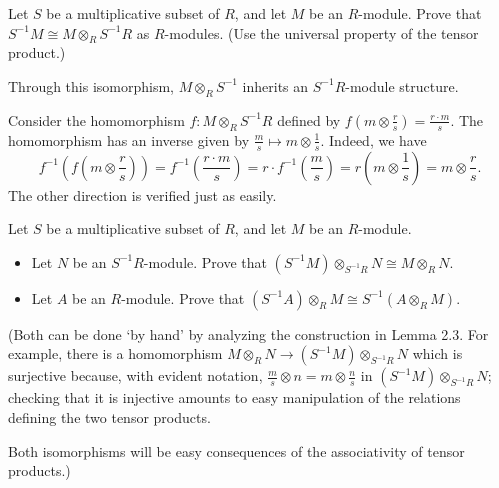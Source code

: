 \documentclass[../../master.tex]{subfiles}
\begin{document}
\begin{problem}
    Let $S$ be a multiplicative subset of $R$, and let $M$ be an $R$-module.
    Prove that $S^{-1}M \cong M \otimes_R S^{-1}R$ as $R$-modules.
    (Use the universal property of the tensor product.)

    Through this isomorphism, $M \otimes_R S^{-1}$ inherits an $S^{-1}R$-module structure.
\end{problem}

\begin{solution}
    Consider the homomorphism $f : M \otimes_R S^{-1}R$ defined by $f(m \otimes \frac{r}{s}) = \frac{r \cdot m}{s}$.
    The homomorphism has an inverse given by $\frac{m}{s} \mapsto m \otimes \frac{1}{s}$.
    Indeed, we have
    \[
        f^{-1}\left(f\left(m \otimes \frac{r}{s}\right)\right) = f^{-1}\left(\frac{r \cdot m}{s}\right) = r \cdot f^{-1}\left(\frac{m}{s}\right) = r\left(m \otimes \frac{1}{s}\right) = m \otimes \frac{r}{s}.
    \]
    The other direction is verified just as easily.
\end{solution}

\begin{problem}
    Let $S$ be a multiplicative subset of $R$, and let $M$ be an $R$-module.
    \begin{itemize}
        \item Let $N$ be an $S^{-1}R$-module.
            Prove that $(S^{-1}M) \otimes_{S^{-1}R} N \cong M \otimes_R N$.
        \item Let $A$ be an $R$-module.
            Prove that $(S^{-1}A) \otimes_R M \cong S^{-1}(A \otimes_R M)$.
    \end{itemize}
    (Both can be done `by hand' by analyzing the construction in Lemma 2.3.
    For example, there is a homomorphism $M \otimes_R N \to (S^{-1}M) \otimes_{S^{-1}R} N$ which is surjective because, with evident notation, $\frac{m}{s} \otimes n = m \otimes \frac{n}{s}$ in $(S^{-1}M) \otimes_{S^{-1}R} N$;
    checking that it is injective amounts to easy manipulation of the relations defining the two tensor products.

    Both isomorphisms will be easy consequences of the associativity of tensor products.)
\end{problem}
\end{document}
